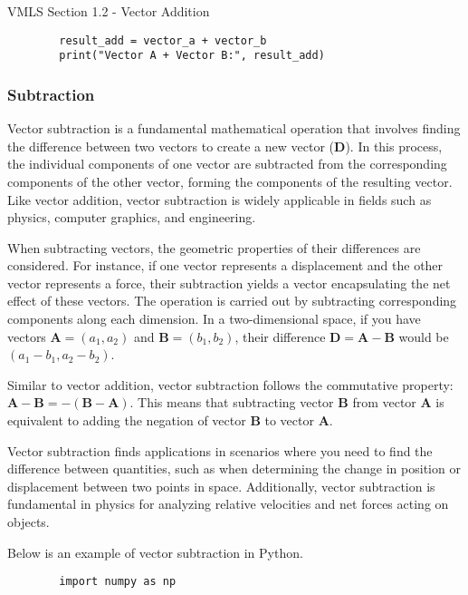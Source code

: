 \begin{notes}{VMLS Section 1.2 - Vector Addition}
\begin{Highlight}
\begin{verbatim}
        result_add = vector_a + vector_b
        print("Vector A + Vector B:", result_add)
        \end{verbatim}
    \end{Highlight}

    \subsubsection*{Subtraction}

    Vector subtraction is a fundamental mathematical operation that involves finding the difference between two vectors to create a new vector ($\mathbf{D}$). In this process, the individual components of one vector 
    are subtracted from the corresponding components of the other vector, forming the components of the resulting vector. Like vector addition, vector subtraction is widely applicable in fields such as physics, 
    computer graphics, and engineering.

    When subtracting vectors, the geometric properties of their differences are considered. For instance, if one vector represents a displacement and the other vector represents a force, their subtraction yields a 
    vector encapsulating the net effect of these vectors. The operation is carried out by subtracting corresponding components along each dimension. In a two-dimensional space, if you have vectors $\mathbf{A} = (a_1, a_2)$ 
    and $\mathbf{B} = (b_1, b_2)$, their difference $\mathbf{D} = \mathbf{A} - \mathbf{B}$ would be $(a_1 - b_1, a_2 - b_2)$.
    
    Similar to vector addition, vector subtraction follows the commutative property: $\mathbf{A} - \mathbf{B} = -(\mathbf{B} - \mathbf{A})$. This means that subtracting vector $\mathbf{B}$ from vector $\mathbf{A}$ is 
    equivalent to adding the negation of vector $\mathbf{B}$ to vector $\mathbf{A}$.

    Vector subtraction finds applications in scenarios where you need to find the difference between quantities, such as when determining the change in position or displacement between two points in space. Additionally, 
    vector subtraction is fundamental in physics for analyzing relative velocities and net forces acting on objects.

    \begin{Highlight}
        Below is an example of vector subtraction in Python.

        \begin{verbatim}
        import numpy as np


\end{verbatim}
\end{Highlight}
\end{notes}
